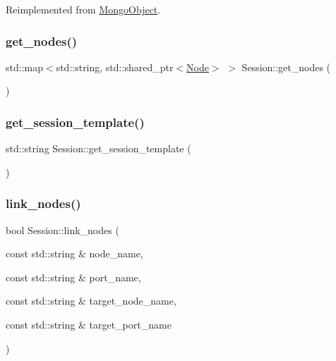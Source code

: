 Reimplemented from \hyperlink{class_mongo_object_ac21cbe104a818f7e6ee7dcfbb521e9e1}{Mongo\+Object}.

\mbox{\label{class_session_af091cae3db4abcc5afe4a8abaef222f2}} 
\subsubsection{\texorpdfstring{get\+\_\+nodes()}{get\_nodes()}}
{\footnotesize\ttfamily std\+::map$<$std\+::string, std\+::shared\+\_\+ptr$<$\hyperlink{class_node}{Node}$>$ $>$ Session\+::get\+\_\+nodes (\begin{DoxyParamCaption}{ }\end{DoxyParamCaption})}

\mbox{\label{class_session_a7083c5cb94be76912b0fe02d003766be}} 
\subsubsection{\texorpdfstring{get\+\_\+session\+\_\+template()}{get\_session\_template()}}
{\footnotesize\ttfamily std\+::string Session\+::get\+\_\+session\+\_\+template (\begin{DoxyParamCaption}{ }\end{DoxyParamCaption})}

\mbox{\label{class_session_aa9b0d73252fbb01cab292ef6b425da12}} 
\subsubsection{\texorpdfstring{link\+\_\+nodes()}{link\_nodes()}}
{\footnotesize\ttfamily bool Session\+::link\+\_\+nodes (\begin{DoxyParamCaption}\item[{const std\+::string \&}]{node\+\_\+name,  }\item[{const std\+::string \&}]{port\+\_\+name,  }\item[{const std\+::string \&}]{target\+\_\+node\+\_\+name,  }\item[{const std\+::string \&}]{target\+\_\+port\+\_\+name }\end{DoxyParamCaption})}

